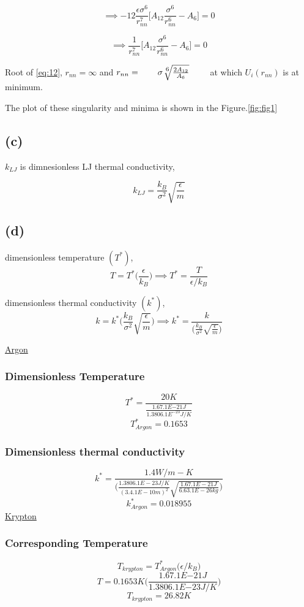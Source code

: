 \documentclass{article}
\begin{document}
$$\implies -12\frac{\epsilon\sigma^6}{r_{nn}^7} \Big[ A_{12}\frac{\sigma^6}{r_{nn}^6} - A_6 \Big] = 0$$

\begin{equation}
\implies \frac{1}{r_{nn}^7} \Big[ A_{12}\frac{\sigma^6}{r_{nn}^6} - A_6 \Big] = 0 \label{eq:12}
\end{equation}

Root of \eqref{eq:12}, $r_{nn}=\infty$ and $r_{nn} = \qquad \sigma\sqrt[\leftroot{-1}\uproot{2}\scriptstyle 6]{\frac{2A_{12}}{A_6}}\qquad$ at which $U_i(r_{nn})$ is at minimum.

The plot of these singularity and minima is shown in the Figure.\ref{fig:fig1}

\subsection{(c)}
\label{sec-4-3}
$k_{LJ}$ is dimnesionless LJ thermal conductivity,

$$\boxed{k_{LJ} = \frac{k_B}{\sigma^2} \sqrt{\frac{\epsilon}{m}}}$$

\subsection{(d)}
\label{sec-4-4}
dimensionless temperature $(T^{*})$, 
$$ T = T^{*} \Big(\frac{\epsilon}{k_B}\Big) \implies T^{*} = \frac{T}{\epsilon/k_B} $$

dimensionless thermal conductivity $(k^{*})$, 
$$k = k^{*}\Big(\frac{k_B}{\sigma^2}\sqrt{\frac{\epsilon}{m}}\Big) \implies k^* = \frac{k}{\Big(\frac{k_B}{\sigma^2}\sqrt{\frac{\epsilon}{m}}\Big)}$$

\uline{Argon}
\subsubsection{Dimensionless Temperature}
\label{sec-4-4-1}
$$T^* = \frac{20K}{\frac{1.67.1E{-21}J}{1.3806.1E^{-23}J/K}}$$
$$\boxed{T^*_{Argon} = 0.1653}$$
\subsubsection{Dimensionless thermal conductivity}
\label{sec-4-4-2}
$$k^* = \frac{1.4W/m-K}{\Big(\frac{1.3806.1E-23J/K}{(3.4.1E-10 m)^2}\sqrt{\frac{1.67.1E-21J}{6.63.1E-26 kg}}\Big)} $$
$$\boxed{k_{Argon}^{*} = 0.018955} $$
\uline{Krypton}
\subsubsection{Corresponding Temperature}
\label{sec-4-4-3}
$$T_{krypton} = T^*_{Argon} \Big(\epsilon/k_B\Big)$$
$$T = 0.1653K \Big(\frac{1.67.1E{-21}J}{1.3806.1E{-23}J/K}\Big)$$
$$\boxed{T_{krypton} = 26.82K}$$
\end{document}
